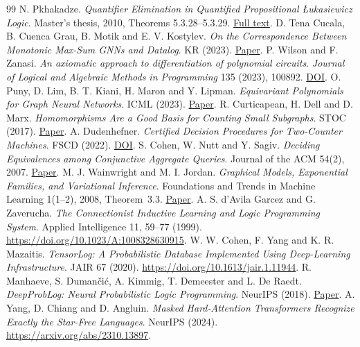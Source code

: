 \documentclass[11pt,a4paper]{article}
\theoremstyle{definition}
\theoremstyle{remark}\newaliascnt{remark}{theorem}
\numberwithin{equation}{section}
\begin{document}
\begin{thebibliography}{99}
 N. Pkhakadze. \emph{Quantifier Elimination in Quantified Propositional \L{}ukasiewicz Logic}. Master's thesis, 2010, Theorems 5.3.28--5.3.29. \href{https://citeseerx.ist.psu.edu/document?doi=58b23a00fbfc599d6a070f0359b9577b71e0e3c2&repid=rep1&type=pdf}{Full text}.
 D. Tena Cucala, B. Cuenca Grau, B. Motik and E. V. Kostylev. \emph{On the Correspondence Between Monotonic Max-Sum GNNs and Datalog}. KR (2023). \href{https://arxiv.org/abs/2305.18015}{Paper}.
 P. Wilson and F. Zanasi. \emph{An axiomatic approach to differentiation of polynomial circuits}. \emph{Journal of Logical and Algebraic Methods in Programming} 135 (2023), 100892. \href{https://doi.org/10.1016/j.jlamp.2023.100892}{DOI}.
 O. Puny, D. Lim, B. T. Kiani, H. Maron and Y. Lipman. \emph{Equivariant Polynomials for Graph Neural Networks}. ICML (2023). \href{https://proceedings.mlr.press/v202/puny23a.html}{Paper}.
 R. Curticapean, H. Dell and D. Marx. \emph{Homomorphisms Are a Good Basis for Counting Small Subgraphs}. STOC (2017). \href{https://arxiv.org/abs/1705.01595}{Paper}.
 A. Dudenhefner. \emph{Certified Decision Procedures for Two-Counter Machines}. FSCD (2022). \href{https://doi.org/10.4230/LIPIcs.FSCD.2022.16}{DOI}.
 S. Cohen, W. Nutt and Y. Sagiv. \emph{Deciding Equivalences among Conjunctive Aggregate Queries}. Journal of the ACM 54(2), 2007.
\href{https://www.inf.unibz.it/~nutt/Teaching/FDBs1718/FDBsPapers/cohenEtAl-JACM-07.pdf}{Paper}.
 M. J. Wainwright and M. I. Jordan. \emph{Graphical Models, Exponential Families, and Variational Inference}. Foundations and Trends in Machine Learning 1(1--2), 2008, Theorem~3.3.
\href{https://people.eecs.berkeley.edu/~jordan/sail/readings/wainwright-jordan-fnt.pdf}{Paper}.
 A. S. d'Avila Garcez and G. Zaverucha. \emph{The Connectionist Inductive Learning and Logic Programming System}. Applied Intelligence 11, 59--77 (1999). \url{https://doi.org/10.1023/A:1008328630915}.
 W. W. Cohen, F. Yang and K. R. Mazaitis. \emph{TensorLog: A Probabilistic Database Implemented Using Deep-Learning Infrastructure}. JAIR 67 (2020). \url{https://doi.org/10.1613/jair.1.11944}.
 R. Manhaeve, S. Duman\v{c}i\'c, A. Kimmig, T. Demeester and L. De Raedt. \emph{DeepProbLog: Neural Probabilistic Logic Programming}. NeurIPS (2018). \href{https://proceedings.neurips.cc/paper_files/paper/2018/hash/dc5d637ed5e62c36ecb73b654b05ba2a-Abstract.html}{Paper}.
 A. Yang, D. Chiang and D. Angluin. \emph{Masked Hard-Attention Transformers Recognize Exactly the Star-Free Languages}. NeurIPS (2024). \url{https://arxiv.org/abs/2310.13897}.

\end{thebibliography}
\end{document}
